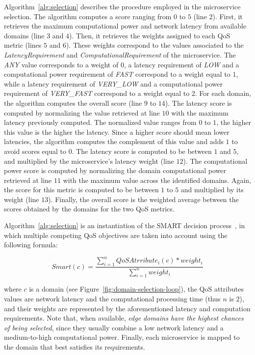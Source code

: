 Algorithm~\ref{alg:selection} describes the procedure employed in the microservice selection. The algorithm computes a score ranging from $0$ to $5$ (line $2$). First, it retrieves the maximum computational power and network latency from available domains (line $3$ and $4$). Then, it retrieves the weights assigned to each QoS metric (lines $5$ and $6$). These weights correspond to the values associated to the \textit{LatencyRequirement} and \textit{ComputationalRequirement} of the microservice. The \textit{ANY} value corresponds to a weight of $0$, a latency requirement of \textit{LOW} and a computational power requirement of \textit{FAST} correspond to a weight equal to $1$, while a latency requirement of \textit{VERY\_LOW} and a computational power requirement of \textit{VERY\_FAST} correspond to a weight equal to $2$. For each domain, the algorithm computes the overall score (line $9$ to $14$). The latency score is computed by normalizing the value retrieved at line $10$ with the maximum latency previously computed. The normalized value ranges from $0$ to $1$, the higher this value is the higher the latency. Since a higher score should mean lower latencies, the algorithm computes the complement of this value and adds $1$ to avoid scores equal to $0$. The latency score is computed to be between $1$ and $5$, and multiplied by the microservice's latency weight (line $12$). The computational power score is computed by normalizing the domain computational power retrieved at line $11$ with the maximum value across the identified domains. Again, the score for this metric is computed to be between $1$ to $5$ and multiplied by its weight (line $13$). Finally, the overall score is the weighted average between the scores obtained by the domains for the two QoS metrics.

Algorithm~\ref{alg:selection} is an instantiation of the SMART decision process~\cite{Olson1996}, in which multiple competing QoS objectives are taken into account using the following formula:

\begin{equation}
Smart(c) = \frac{\sum_{i=1}^{n} QoSAtrribute_i(c)*weight_i}{\sum_{i=1}^{n}weight_i} \label{eq:smart}
\end{equation}

\noindent
where $c$ is a domain (see Figure~\ref{fig:domain-selection-loop}), the QoS attributes values are network latency and the computational processing time (thus $n$ is $2$), and their weights are represented by the aforementioned latency and computation requirements. Note that, when available, \textit{edge domains have the highest chances of being selected}, since they usually combine a low network latency and a medium-to-high computational power. Finally, each microservice is mapped to the domain that best satisfies its requirements.

